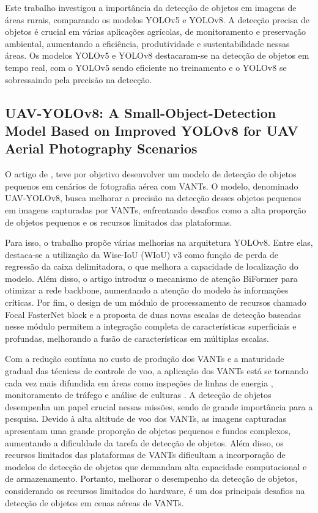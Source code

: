 Este trabalho investigou a importância da detecção de objetos em imagens de áreas rurais, comparando os modelos YOLOv5 e YOLOv8. A detecção precisa de objetos é crucial em várias aplicações agrícolas, de monitoramento e preservação ambiental, aumentando a eficiência, produtividade e sustentabilidade nessas áreas. Os modelos YOLOv5 e YOLOv8 destacaram-se na detecção de objetos em tempo real, com o YOLOv5 sendo eficiente no treinamento e o YOLOv8 se sobressaindo pela precisão na detecção.


\subsection{UAV-YOLOv8: A Small-Object-Detection Model Based on Improved YOLOv8 for UAV Aerial Photography Scenarios}

O artigo de \cite{wang2023uav}, teve por objetivo desenvolver um modelo de detecção de objetos pequenos em cenários de fotografia aérea com VANTs. O modelo, denominado UAV-YOLOv8, busca melhorar a precisão na detecção desses objetos pequenos em imagens capturadas por VANTs, enfrentando desafios como a alta proporção de objetos pequenos e os recursos limitados das plataformas.

Para isso, o trabalho propõe várias melhorias na arquitetura YOLOv8. Entre elas, destaca-se a utilização da Wise-IoU (WIoU) v3 \cite{tong2023wise} como função de perda de regressão da caixa delimitadora, o que melhora a capacidade de localização do modelo. Além disso, o artigo introduz o mecanismo de atenção BiFormer para otimizar a rede backbone, aumentando a atenção do modelo às informações críticas. Por fim, o design de um módulo de processamento de recursos chamado Focal FasterNet block e a proposta de duas novas escalas de detecção baseadas nesse módulo permitem a integração completa de características superficiais e profundas, melhorando a fusão de características em múltiplas escalas.

Com a redução contínua no custo de produção dos VANTs e a maturidade gradual das técnicas de controle de voo, a aplicação dos VANTs está se tornando cada vez mais difundida em áreas como inspeções de linhas de energia , monitoramento de tráfego e análise de culturas . A detecção de objetos desempenha um papel crucial nessas missões, sendo de grande importância para a pesquisa. Devido à alta altitude de voo dos VANTs, as imagens capturadas apresentam uma grande proporção de objetos pequenos e fundos complexos, aumentando a dificuldade da tarefa de detecção de objetos. Além disso, os recursos limitados das plataformas de VANTs dificultam a incorporação de modelos de detecção de objetos que demandam alta capacidade computacional e de armazenamento. Portanto, melhorar o desempenho da detecção de objetos, considerando os recursos limitados do hardware, é um dos principais desafios na detecção de objetos em cenas aéreas de VANTs.

